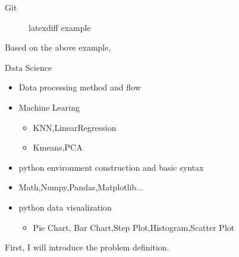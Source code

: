 \documentclass[
 size=12pt,
 paper=smartboard,  %
 mode=present, 		%
 display=slides, 	%
 style=tuliplab,  	%
 pauseslide,
 fleqn,leqno]{powerdot}
\begin{document}
\begin{slide}{Git}
{\begin{figure}
        \caption{latexdiff example}
      \end{figure}
      }



\begin{note}
Based on the above example,
\end{note}

\end{slide}


\begin{slide}{Data Science}
  \begin{center}
  \begin{itemize}
    \item
    Data processing method and flow
    \item
    Machine Learing
    \begin{itemize}
      \item
      KNN,LinearRegression
      \item
      Kmeans,PCA
    \end{itemize}
    \bigskip
    \item
    python environment construction and basic syntax
    \item
    Math,Numpy,Pandas,Matplotlib...
    \item
    python data visualization
    \begin{itemize}
      \item
      Pie Chart, Bar Chart,Step Plot,Histogram,Scatter Plot
    \end{itemize}
  \end{itemize}
  \end{center}
  \begin{note}
  First, I will introduce the problem definition.
  \end{note}
  
  \end{slide}
\end{document}
